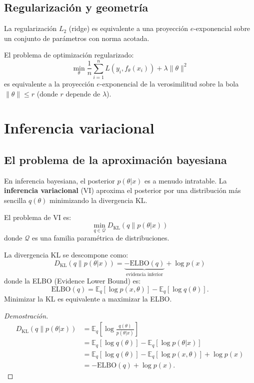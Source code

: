 \subsection{Regularización y geometría}

La regularización $L_2$ (ridge) es equivalente a una proyección $e$-exponencial sobre un conjunto de parámetros con norma acotada.

\begin{proposition}
	El problema de optimización regularizado:
	\[
	\min_\theta \frac{1}{n}\sum_{i=1}^n L(y_i, f_\theta(x_i)) + \lambda \|\theta\|^2
	\]
	es equivalente a la proyección $e$-exponencial de la verosimilitud sobre la bola $\|\theta\| \le r$ (donde $r$ depende de $\lambda$).
\end{proposition}

\section{Inferencia variacional}

\subsection{El problema de la aproximación bayesiana}

En inferencia bayesiana, el posterior $p(\theta | x)$ es a menudo intratable.  La \textbf{inferencia variacional} (VI) aproxima el posterior por una distribución más sencilla $q(\theta)$ minimizando la divergencia KL.

\begin{definition}
	El problema de VI es:
	\[
	\min_{q \in \mathcal{Q}} D_{\mathrm{KL}}(q \| p(\theta | x))
	\]
	donde $\mathcal{Q}$ es una familia paramétrica de distribuciones.
\end{definition}

\begin{theorem}
	La divergencia KL se descompone como:
	\[
	D_{\mathrm{KL}}(q \| p(\theta | x)) = \underbrace{-\mathrm{ELBO}(q)}_{\text{evidencia inferior}} + \log p(x)
	\]
	donde la ELBO (Evidence Lower Bound) es:
	\[
	\mathrm{ELBO}(q) = \mathbb{E}_q[\log p(x, \theta)] - \mathbb{E}_q[\log q(\theta)].
	\]
	Minimizar la KL es equivalente a maximizar la ELBO.
\end{theorem}

\begin{proof}[Demostración]
	\begin{align*}
		D_{\mathrm{KL}}(q \| p(\theta|x))
		&= \mathbb{E}_q\!\left[\log \frac{q(\theta)}{p(\theta|x)}\right] \\
		&= \mathbb{E}_q[\log q(\theta)] - \mathbb{E}_q[\log p(\theta|x)] \\
		&= \mathbb{E}_q[\log q(\theta)] - \mathbb{E}_q[\log p(x,\theta)] + \log p(x) \\
		&= -\mathrm{ELBO}(q) + \log p(x).
	\end{align*}
\end{proof}

